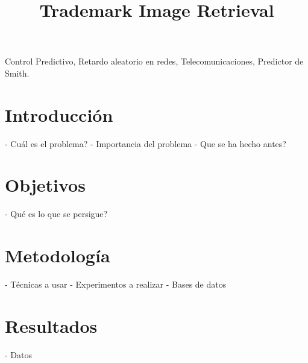 \documentclass[conference]{IEEEtran}
\begin{document}
\title{Trademark Image Retrieval\\
}

\author{
\and
{}
}


\maketitle

\begin{abstract}

\end{abstract}

\begin{IEEEkeywords}
Control Predictivo, Retardo aleatorio en redes, Telecomunicaciones, Predictor de Smith.
\end{IEEEkeywords}

\section{Introducción}
 - Cuál es el problema?
 - Importancia del problema
 - Que se ha hecho antes?


\section{Objetivos}

- Qué es lo que se persigue?

\section{Metodología}
- Técnicas a usar
- Experimentos a realizar
- Bases de datos


\section{Resultados}

 - Datos
\end{document}
